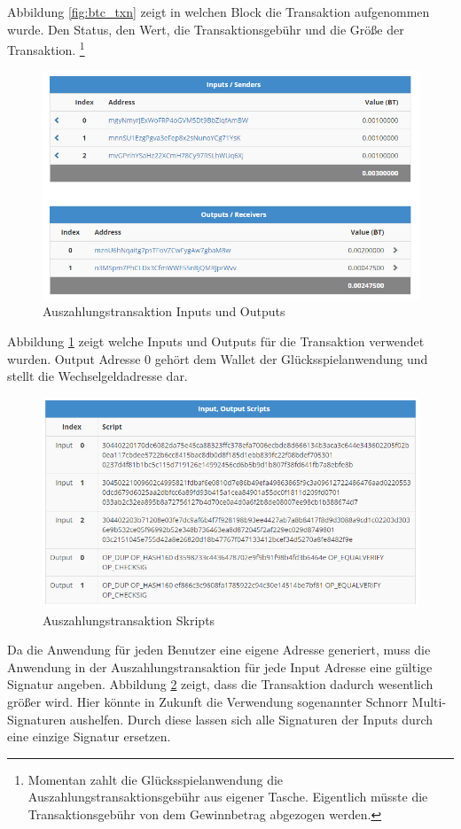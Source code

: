 Abbildung \ref{fig:btc_txn} zeigt in welchen Block die Transaktion aufgenommen wurde. Den Status, den Wert, die Transaktionsgebühr und die Größe der Transaktion.
\footnote{Momentan zahlt die Glücksspielanwendung die Auszahlungstransaktionsgebühr aus eigener Tasche. Eigentlich müsste die Transaktionsgebühr von dem Gewinnbetrag abgezogen werden.}

\begin{figure}[H]
\centering
\includegraphics[width=1\linewidth]{Figures/btc_gui/btc_txn_input_output}
\decoRule
\caption{Auszahlungstransaktion Inputs und Outputs}
\label{fig:btc_txn_input_output}
\end{figure}


Abbildung \ref{fig:btc_txn_input_output} zeigt welche Inputs und Outputs für die Transaktion verwendet wurden. Output Adresse 0 gehört dem Wallet der Glücksspielanwendung und stellt die Wechselgeldadresse dar.


\begin{figure}[H]
\centering
\includegraphics[width=1\linewidth]{Figures/btc_gui/btc_txn_input_output_scripts}
\decoRule
\caption{Auszahlungstransaktion Skripts}
\label{fig:btc_txn_input_output_scripts}
\end{figure}

Da die Anwendung für jeden Benutzer eine eigene Adresse generiert, muss die Anwendung in der Auszahlungstransaktion für jede Input Adresse eine gültige Signatur angeben. Abbildung \ref{fig:btc_txn_input_output_scripts} zeigt, dass die Transaktion dadurch wesentlich größer wird. Hier könnte in Zukunft die Verwendung sogenannter Schnorr Multi-Signaturen aushelfen. Durch diese lassen sich alle Signaturen der Inputs durch eine einzige Signatur ersetzen. \citep{schnorr_sig}
